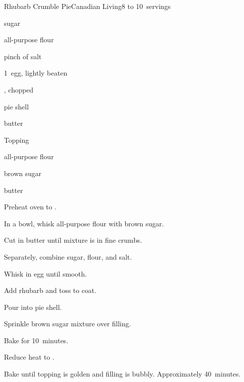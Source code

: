 \begin{recipe}{Rhubarb Crumble Pie}{Canadian Living}{8 to 10~servings}

\begin{ingredients}
\item \C{1\quarter} sugar
\item {} all-purpose flour
\item pinch of salt
\item 1~egg, lightly beaten
\item {} , chopped
\item pie shell
\item {} butter
\end{ingredients}

Topping
\begin{ingredients}
\item \C{\threequarter} all-purpose flour
\item \C{\third} brown sugar
\item \C{\third} butter
\end{ingredients}

\begin{directions}
\item Preheat oven to .
\item In a bowl, whisk \C{\threequarter} all-purpose flour with brown sugar.
\item Cut in \C{\third} butter until mixture is in fine crumbs.
\item Separately, combine sugar,  flour, and salt.
\item Whisk in egg until smooth.
\item Add rhubarb and toss to coat.
\item Pour into pie shell.
\item Sprinkle brown sugar mixture over filling.
\item Bake for 10~minutes.
\item Reduce heat to .
\item Bake until topping is golden and filling is bubbly. Approximately 40~minutes.
\end{directions}

\end{recipe}
